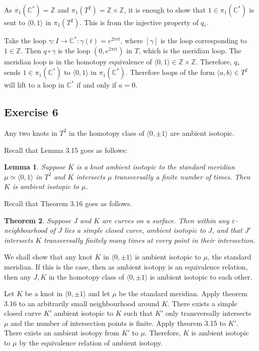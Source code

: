 \documentclass{article}
\newtheorem{theorem}{Theorem}
\newtheorem{lemma}[theorem]{Lemma}
\theoremstyle{definition}
\numberwithin{theorem}{section}
\numberwithin{equation}{section}
\begin{document}
As $\pi_1(\mathbb{C}^*) = \mathbb{Z}$ and $\pi_1(T^2) = \mathbb{Z} \times \mathbb{Z}$, it is enough to show that $1 \in \pi_1(\mathbb{C}^*)$ is sent to $\langle 0, 1 \rangle$ in $\pi_1(T^2)$. This is from the injective property of $q_*$. 

Take the loop $\gamma : I \rightarrow \mathbb{C}^*: \gamma(t) = e^{2 \pi i t}$, where $[\gamma]$ is the loop corresponding to $1 \in \mathbb{Z}$. Then $q \circ \gamma$ is the loop $(0, e^{2 \pi i t})$ in $T$, which is the meridian loop. The meridian loop is in the homotopy equivalence of $\langle 0, 1 \rangle \in \mathbb{Z} \times \mathbb{Z}$. Therefore, $q_\ast$ sends $1 \in \pi_1(\mathbb{C}^*)$ to $\langle 0, 1 \rangle$ in $\pi_1(\mathbb{C}^*)$. Therefore loops of the form $ \langle a, b \rangle \in T^2$ will lift to a loop in $\mathbb{C}^*$ if and only if $a = 0$.

\subsection{Exercise 6}

Any two knots in $T^2$ in the homotopy class of $\langle 0, \pm 1 \rangle$ are ambient isotopic.

Recall that Lemma 3.15 goes as follows:
\begin{lemma}
    Suppose $K$ is a knot ambient isotopic to the standard meridian $\mu \simeq \langle 0, 1 \rangle$ in $T^2$ and $K$ intersects $\mu$ transversally a finite number of times. Then $K$ is ambient isotopic to $\mu$. 
\end{lemma}

Recall that Theorem 3.16 goes as follows.

\begin{theorem}
    Suppose $J$ and $K$ are curves on a surface. Then within any $\varepsilon$-neighbourhood of $J$ lies a simple closed curve, ambient isotopic to $J$, and that $J'$ intersects $K$ transversally finitely many times at every point in their intersection.
\end{theorem}

We shall show that any knot $K$ in $\langle 0, \pm 1 \rangle$ is ambient isotopic to $\mu$, the standard meridian. If this is the case, then as ambient isotopy is an equivalence relation, then any $J, K$ in the homotopy class of $\langle 0, \pm 1 \rangle$ is ambient isotopic to each other.

Let $K$ be a knot in $\langle 0, \pm 1 \rangle$ and let $\mu$ be the standard meridian. Apply theorem 3.16 to an arbitrarily small neighbourhood around $K$. There exists a simple closed curve $K'$ ambient isotopic to $K$ such that $K'$ only transversally intersects $\mu$ and the number of intersection points is finite. Apply theorem 3.15 to $K'$. There exists an ambient isotopy from $K'$ to $\mu$. Therefore, $K$ is ambient isotopic to $\mu$ by the equivalence relation of ambient isotopy.
\end{document}
